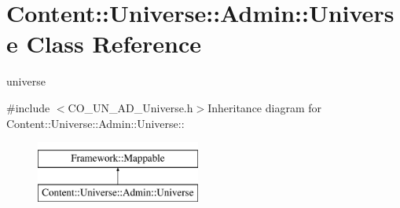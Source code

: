 \hypertarget{classContent_1_1Universe_1_1Admin_1_1Universe}{
\section{Content::Universe::Admin::Universe Class Reference}
\label{classContent_1_1Universe_1_1Admin_1_1Universe}
}


universe  


{\ttfamily \#include $<$CO\_\-UN\_\-AD\_\-Universe.h$>$}Inheritance diagram for Content::Universe::Admin::Universe::\begin{figure}[H]
\begin{center}
\leavevmode
\includegraphics[height=2cm]{classContent_1_1Universe_1_1Admin_1_1Universe}
\end{center}
\end{figure}
